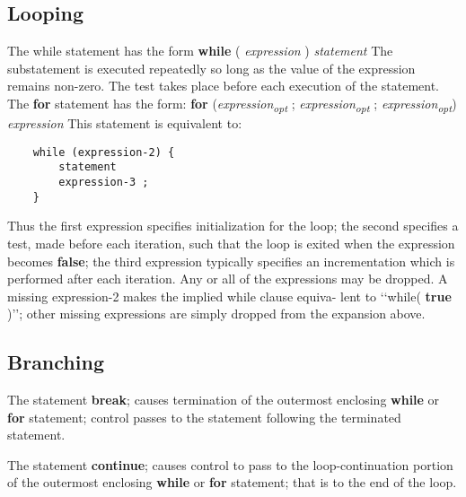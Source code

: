 \begin{homeworkProblem}
	\subsection{Looping}
    The while statement has the form
    \newline
    \textbf{while} ( \textit{expression} ) \textit{statement}
    \newline
    The substatement is executed repeatedly so long as the value of the expression remains non-zero. The test takes place before each execution of the statement.
    \newline
    \newline
    The \textbf{for} statement has the form:
    \newline
    \textbf{for} (\textit{expression\textsubscript{opt}} ; \textit{expression\textsubscript{opt}} ; \textit{expression\textsubscript{opt}}) \textit{expression}
    \newline
    This statement is equivalent to:
    \begin{verbatim}
    while (expression-2) {
        statement
        expression-3 ;
    }
    \end{verbatim}
    Thus the first expression specifies initialization for the loop; the second specifies a test, made before each iteration, such that the loop is exited when the expression becomes \textbf{false}; the third expression typically specifies an incrementation which is performed after each iteration.
    Any or all of the expressions may be dropped. A missing expression-2 makes the implied while clause equiva- lent to ‘‘while( \textbf{true} )’’; other missing expressions are simply dropped from the expansion above.

	\subsection{Branching}
    The statement
    \newline
    \newline
	\textbf{break};
    \newline
    \newline
    causes termination of the outermost enclosing \textbf{while} or \textbf{for} statement; control passes to the statement following the terminated statement.

    The statement 
    \newline
    \newline
    \textbf{continue};
    \newline
    \newline
    causes control to pass to the loop-continuation portion of the outermost enclosing \textbf{while} or \textbf{for} statement; that is to the end of the loop.


\end{homeworkProblem}
